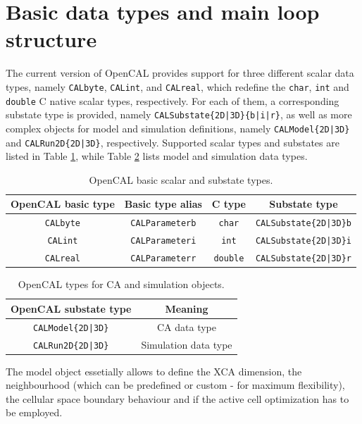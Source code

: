\section{Basic data types and main loop structure}

The current version of OpenCAL provides support for three different
scalar data types, namely \verb'CALbyte', \verb'CALint', and
\verb'CALreal', which redefine the \verb'char', \verb'int' and
\verb'double' C native scalar types, respectively. For each of them, a
corresponding substate type is provided, namely
\verb'CALSubstate{2D|3D}{b|i|r}', as well as more complex objects for
model and simulation definitions, namely \verb'CALModel{2D|3D}' and
\verb'CALRun2D{2D|3D}', respectively. Supported scalar types and
substates are listed in Table \ref{tab:basic_types}, while Table
\ref{tab:ca_sim_types} lists model and simulation data types.

\begin{table}
  \centering
  \begin{tabular}{c|c|c|c}
    \hline
    OpenCAL basic type & Basic type alias & C type & Substate type\\
    \hline
    \verb'CALbyte' & \verb'CALParameterb' & \verb'char'   &  \verb'CALSubstate{2D|3D}b'\\
    \verb'CALint'  & \verb'CALParameteri' & \verb'int'   &  \verb'CALSubstate{2D|3D}i'\\
    \verb'CALreal' & \verb'CALParameterr' & \verb'double' &  \verb'CALSubstate{2D|3D}r'\\
    \hline
  \end{tabular}
  \caption{OpenCAL basic scalar and substate types.}
  \label{tab:basic_types}
\end{table}

\begin{table}
  \centering
  \begin{tabular}{c|c}
    \hline
    OpenCAL substate type & Meaning \\
    \hline
    \verb'CALModel{2D|3D}' & CA data type\\
    \verb'CALRun2D{2D|3D}' & Simulation data type\\
    \hline
  \end{tabular}
  \caption{OpenCAL types for CA and simulation objects.}
  \label{tab:ca_sim_types}
\end{table}

The model object essetially allows to define the XCA dimension, the
neighbourhood (which can be predefined or custom - for maximum
flexibility), the cellular space boundary behaviour and if the active
cell optimization has to be employed.

